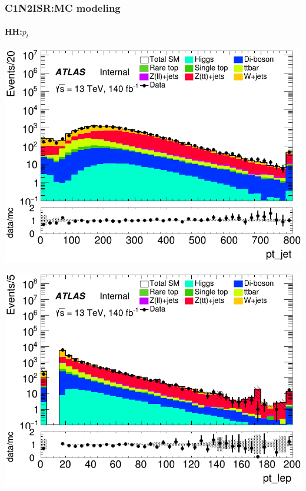 \documentclass[usenames,dvipsnames]{beamer}
\begin{document}
\begin{frame}
\frametitle{C1N2ISR:MC modeling}
\framesubtitle{HH:\quad $p_t$}
    \begin{minipage}{0.32\textwidth}
        \centering
        \includegraphics[width=\textwidth]{graphics/HH_met/HH_met_pt_jet.png}
    \end{minipage}
    \hfill
    \begin{minipage}{0.32\textwidth}
        \centering
        \includegraphics[width=\textwidth]{graphics/HH_met/HH_met_pt_lep.png}
    \end{minipage}
    \hfill
    \begin{minipage}{0.32\textwidth}
        \centering

\end{minipage}
\end{frame}
\end{document}

